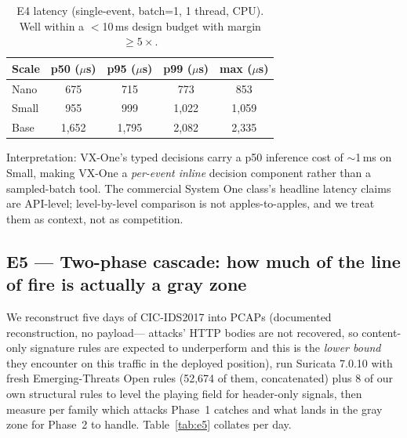\documentclass[sigconf,anonymous=false]{acmart}
\begin{document}
\begin{table}[t]
\caption{E4 latency (single-event, batch=1, 1 thread, CPU). Well within a $<$10\,ms design budget with margin $\ge 5\times$.}
\label{tab:e4}
\small
\begin{tabular}{lcccc}
\toprule
Scale & p50 ($\mu$s) & p95 ($\mu$s) & p99 ($\mu$s) & max ($\mu$s) \\
\midrule
Nano  & 675    & 715    & 773    & 853    \\
Small & 955    & 999    & 1{,}022  & 1{,}059  \\
Base  & 1{,}652  & 1{,}795  & 2{,}082  & 2{,}335  \\
\bottomrule
\end{tabular}
\end{table}

Interpretation: VX-One's typed decisions carry a p50 inference cost of $\sim$1\,ms on Small, making VX-One a \emph{per-event inline} decision component rather than a sampled-batch tool. The commercial System One class's headline latency claims are API-level; level-by-level comparison is not apples-to-apples, and we treat them as context, not as competition.

\subsection{E5 --- Two-phase cascade: how much of the line of fire is actually a gray zone}
\label{sec:e5}

We reconstruct five days of CIC-IDS2017 into PCAPs (documented reconstruction, no payload--- attacks' HTTP bodies are not recovered, so content-only signature rules are expected to underperform and this is the \emph{lower bound} they encounter on this traffic in the deployed position), run Suricata 7.0.10 with fresh Emerging-Threats Open rules (52{,}674 of them, concatenated) plus 8 of our own structural rules to level the playing field for header-only signals, then measure per family which attacks Phase~1 catches and what lands in the gray zone for Phase~2 to handle. Table~\ref{tab:e5} collates per day.
\end{document}
